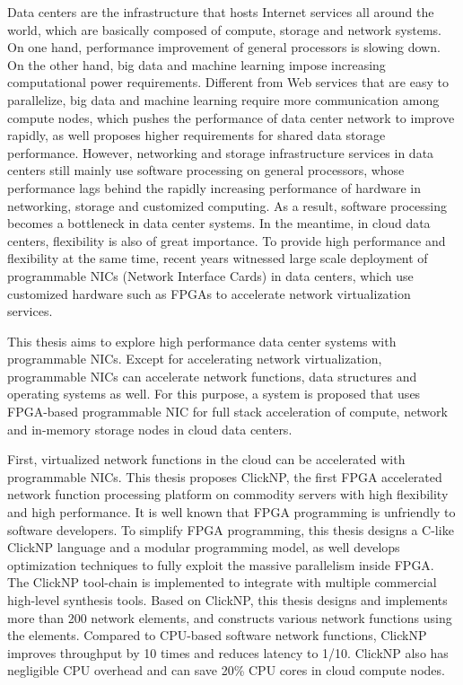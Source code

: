 \begin{enabstract}
	
Data centers are the infrastructure that hosts Internet services all around the world, which are basically composed of compute, storage and network systems.
On one hand, performance improvement of general processors is slowing down.
On the other hand, big data and machine learning impose increasing computational power requirements.
Different from Web services that are easy to parallelize, big data and machine learning require more communication among compute nodes, which pushes the performance of data center network to improve rapidly, as well proposes higher requirements for shared data storage performance.
However, networking and storage infrastructure services in data centers still mainly use software processing on general processors, whose performance lags behind the rapidly increasing performance of hardware in networking, storage and customized computing.
As a result, software processing becomes a bottleneck in data center systems.
In the meantime, in cloud data centers, flexibility is also of great importance.
To provide high performance and flexibility at the same time, recent years witnessed large scale deployment of programmable NICs (Network Interface Cards) in data centers, which use customized hardware such as FPGAs to accelerate network virtualization services.

This thesis aims to explore high performance data center systems with programmable NICs.
Except for accelerating network virtualization, programmable NICs can accelerate network functions, data structures and operating systems as well.
For this purpose, a system is proposed that uses FPGA-based programmable NIC for full stack acceleration of compute, network and in-memory storage nodes in cloud data centers.

First, virtualized network functions in the cloud can be accelerated with programmable NICs. This thesis proposes ClickNP, the first FPGA accelerated network function processing platform on commodity servers with high flexibility and high performance.
It is well known that FPGA programming is unfriendly to software developers.
To simplify FPGA programming, this thesis designs a C-like ClickNP language and a modular programming model, as well develops optimization techniques to fully exploit the massive parallelism inside FPGA.
The ClickNP tool-chain is implemented to integrate with multiple commercial high-level synthesis tools.
Based on ClickNP, this thesis designs and implements more than 200 network elements, and constructs various network functions using the elements.
Compared to CPU-based software network functions, ClickNP improves throughput by 10 times and reduces latency to 1/10.
ClickNP also has negligible CPU overhead and can save 20\% CPU cores in cloud compute nodes.


\end{enabstract}
